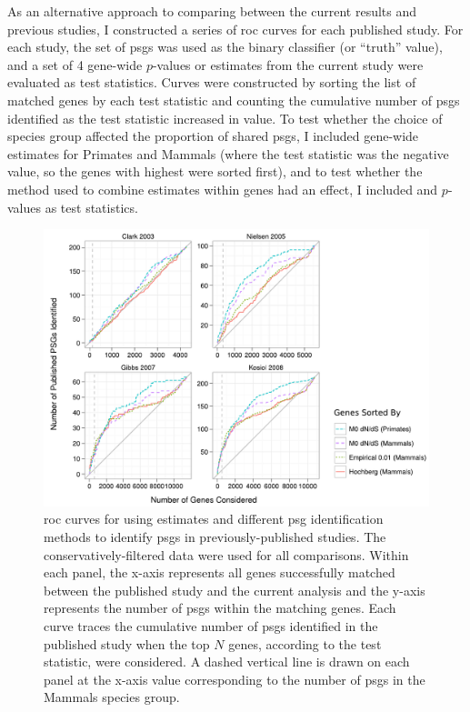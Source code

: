 As an alternative approach to comparing between the current results
and previous studies, I constructed a series of \ac{roc} curves for
each published study. For each study, the set of \acp{psg} was used as
the binary classifier (or ``truth'' value), and a set of 4 gene-wide
$p$-values or \dnds estimates from the current study were evaluated as
test statistics. Curves were constructed by sorting the list of
matched genes by each test statistic and counting the cumulative
number of \acp{psg} identified as the test statistic increased in
value. To test whether the choice of species group affected the
proportion of shared \acp{psg}, I included gene-wide \dnds estimates
for Primates and Mammals (where the test statistic was the negative
\dnds value, so the genes with highest \dnds were sorted first), and
to test whether the method used to combine \sw estimates within genes
had an effect, I included \psgeone and \psghoch $p$-values as test
statistics.

\begin{figure}
\centering
\includegraphics[scale=0.78]{Figs/psg_rocs.pdf}
\caption{\ac{roc} curves for using \dnds estimates and different
  \ac{psg} identification methods to identify \acp{psg} in
  previously-published studies. The conservatively-filtered \sw data
  were used for all comparisons. Within each panel, the x-axis
  represents all genes successfully matched between the published
  study and the current analysis and the y-axis represents the number
  of \acp{psg} within the matching genes. Each curve traces the
  cumulative number of \acp{psg} identified in the published study
  when the top $N$ genes, according to the test statistic, were
  considered. A dashed vertical line is drawn on each panel at the
  x-axis value corresponding to the number of \psgeone \acp{psg} in
  the Mammals species group.}
\label{fig_psg_rocs}
\end{figure}

